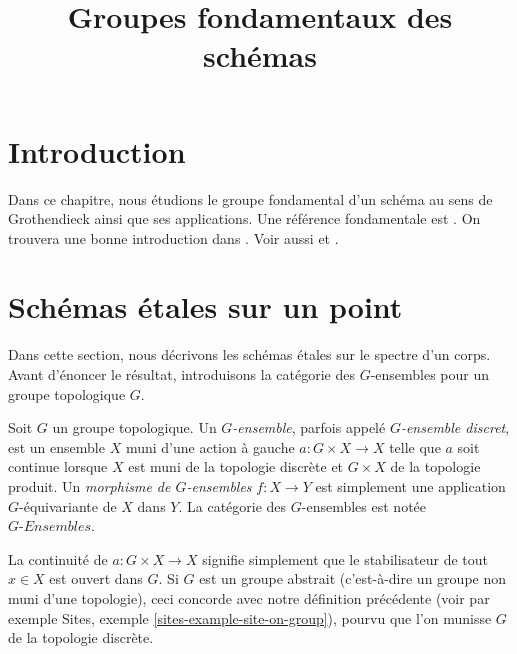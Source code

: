 

%


\title{Groupes fondamentaux des schémas}


\maketitle

\label{section-phantom}

\tableofcontents

\section{Introduction}
\label{section-introduction}

\noindent
Dans ce chapitre, nous étudions le groupe fondamental d'un schéma au sens de
Grothendieck ainsi que ses applications. Une référence fondamentale est
\cite{SGA1}. On trouvera une bonne introduction dans \cite{Lenstra}.
Voir aussi \cite{Murre-lectures} et \cite{Grothendieck-Murre}.










\section{Schémas étales sur un point}
\label{section-schemes-etale-point}

\noindent
Dans cette section, nous décrivons les schémas étales sur le spectre d'un
corps. Avant d'énoncer le résultat, introduisons la catégorie des
$G$-ensembles pour un groupe topologique $G$.

\begin{definition}
\label{definition-G-set-continuous}
Soit $G$ un groupe topologique.
Un {\it $G$-ensemble}, parfois appelé {\it $G$-ensemble discret},
est un ensemble $X$ muni d'une action à gauche $a : G \times X \to X$
telle que $a$ soit continue lorsque $X$ est muni de la topologie discrète et
$G \times X$ de la topologie produit.
Un {\it morphisme de $G$-ensembles} $f : X \to Y$ est simplement une
application $G$-équivariante de $X$ dans $Y$.
La catégorie des $G$-ensembles est notée {\it $G\textit{-Ensembles}$}.
\end{definition}

\noindent
La continuité de $a : G \times X \to X$ signifie simplement que le
stabilisateur de tout $x \in X$ est ouvert dans $G$.
Si $G$ est un groupe abstrait (c'est-à-dire un groupe non muni d'une
topologie), ceci concorde avec notre définition précédente (voir par exemple
Sites, exemple \ref{sites-example-site-on-group}), pourvu que l'on munisse
$G$ de la topologie discrète.

